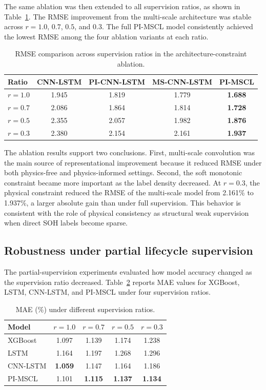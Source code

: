 The same ablation was then extended to all supervision ratios, as shown in Table~\ref{tab:ablation_ratios}. The RMSE improvement from the multi-scale architecture was stable across $r=1.0$, $0.7$, $0.5$, and $0.3$. The full PI-MSCL model consistently achieved the lowest RMSE among the four ablation variants at each ratio.

\begin{table}[t]
\caption{RMSE comparison across supervision ratios in the architecture-constraint ablation.}
\label{tab:ablation_ratios}
\centering
\begin{tabular}{lcccc}
\toprule
Ratio & CNN-LSTM & PI-CNN-LSTM & MS-CNN-LSTM & PI-MSCL \\
\midrule
$r=1.0$ & 1.945 & 1.819 & 1.779 & \textbf{1.688} \\
$r=0.7$ & 2.086 & 1.864 & 1.814 & \textbf{1.728} \\
$r=0.5$ & 2.355 & 2.057 & 1.982 & \textbf{1.876} \\
$r=0.3$ & 2.380 & 2.154 & 2.161 & \textbf{1.937} \\
\bottomrule
\end{tabular}
\end{table}

The ablation results support two conclusions. First, multi-scale convolution was the main source of representational improvement because it reduced RMSE under both physics-free and physics-informed settings. Second, the soft monotonic constraint became more important as the label density decreased. At $r=0.3$, the physical constraint reduced the RMSE of the multi-scale model from 2.161\% to 1.937\%, a larger absolute gain than under full supervision. This behavior is consistent with the role of physical consistency as structural weak supervision when direct SOH labels become sparse.

\subsection{Robustness under partial lifecycle supervision}
\label{subsec:partial_results}

The partial-supervision experiments evaluated how model accuracy changed as the supervision ratio decreased. Table~\ref{tab:mae_ratios} reports MAE values for XGBoost, LSTM, CNN-LSTM, and PI-MSCL under four supervision ratios.

\begin{table}[t]
\caption{MAE (\%) under different supervision ratios.}
\label{tab:mae_ratios}
\centering
\begin{tabular}{lcccc}
\toprule
Model & $r=1.0$ & $r=0.7$ & $r=0.5$ & $r=0.3$ \\
\midrule
XGBoost & 1.097 & 1.139 & 1.174 & 1.238 \\
LSTM & 1.164 & 1.197 & 1.268 & 1.296 \\
CNN-LSTM & \textbf{1.059} & 1.147 & 1.164 & 1.186 \\
PI-MSCL & 1.101 & \textbf{1.115} & \textbf{1.137} & \textbf{1.134} \\
\bottomrule
\end{tabular}
\end{table}

